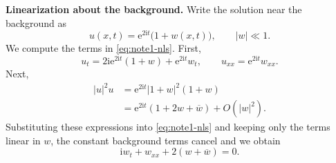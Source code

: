\documentclass{amsart}
\newcounter{note}
\numberwithin{equation}{hw}
\newcommand{\noteheading}[1]{\vspace{1em}\noindent\textbf{#1}}
\begin{document}
\noteheading{Linearization about the background.}
Write the solution near the background as
\begin{equation}
u(x,t)
=
\mathrm{e}^{2\mathrm{i}t}\bigl(1+w(x,t)\bigr),
\qquad
|w|\ll1.
\label{eq:note1-linearization-ansatz}
\end{equation}
We compute the terms in \eqref{eq:note1-nls}.  First,
\begin{equation}
u_t
=
2\mathrm{i}\mathrm{e}^{2\mathrm{i}t}(1+w)
+
\mathrm{e}^{2\mathrm{i}t}w_t,
\qquad
u_{xx}
=
\mathrm{e}^{2\mathrm{i}t}w_{xx}.
\label{eq:note1-linear-derivatives}
\end{equation}
Next,
\begin{align}
|u|^2u
&=
\mathrm{e}^{2\mathrm{i}t}
|1+w|^2(1+w)
\nonumber\\
&=
\mathrm{e}^{2\mathrm{i}t}
\left(1+2w+\overline{w}\right)
+
O(|w|^2).
\label{eq:note1-nonlinear-expansion}
\end{align}
Substituting these expressions into \eqref{eq:note1-nls} and keeping only
the terms linear in \(w\), the constant background terms cancel and we
obtain
\begin{equation}
\mathrm{i}w_t+w_{xx}+2(w+\overline{w})=0.
\label{eq:note1-linearized-equation}
\end{equation}
\end{document}
